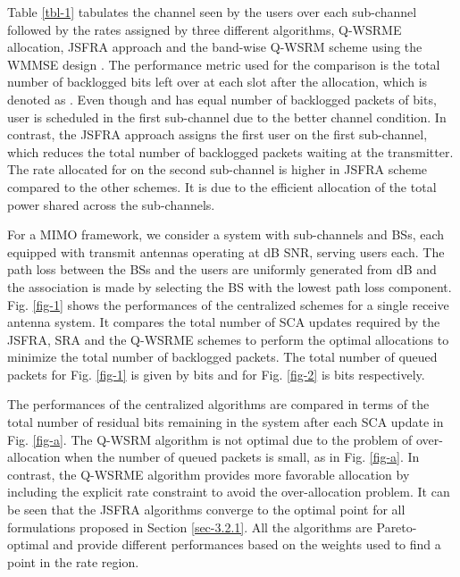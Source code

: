 Table \ref{tbl-1} tabulates the channel seen by the users over each sub-channel followed by the rates assigned by three different algorithms, \ac{Q-WSRME} allocation, \ac{JSFRA} approach and the band-wise \ac{Q-WSRM} scheme using the \ac{WMMSE} design \cite{wmmse_shi}. The performance metric used for the comparison is the total number of backlogged bits left over at each slot after the allocation, which is denoted as . Even though  and  has equal number of backlogged packets of  bits, user  is scheduled in the first sub-channel due to the better channel condition. In contrast, the \ac{JSFRA} approach assigns the first user on the first sub-channel, which reduces the total number of backlogged packets waiting at the transmitter. The rate allocated for  on the second sub-channel is higher in \ac{JSFRA} scheme compared to the other schemes. It is due to the efficient allocation of the total power shared across the sub-channels.

For a \ac{MIMO} framework, we consider a system with  sub-channels and  \acp{BS}, each equipped with  transmit antennas operating at dB \ac{SNR}, serving  users each. The path loss between the \acp{BS} and the users are uniformly generated from \me{[0,-3]} dB and the association is made by selecting the \ac{BS} with the lowest path loss component. Fig. \ref{fig-1} shows the performances of the centralized schemes for a single receive antenna system. It compares the total number of \ac{SCA} updates required by the \ac{JSFRA}, \ac{SRA} and the \ac{Q-WSRME} schemes to perform the optimal allocations to minimize the total number of backlogged packets. The total number of queued packets for Fig. \ref{fig-1} is given by  bits and for Fig. \ref{fig-2} is  bits respectively.

The performances of the centralized algorithms are compared in terms of the total number of residual bits remaining in the system after each \ac{SCA} update in Fig. \ref{fig-a}. The \ac{Q-WSRM} algorithm is not optimal due to the problem of over-allocation when the number of queued packets is small, as in Fig. \ref{fig-a}. In contrast, the \ac{Q-WSRME} algorithm provides more favorable allocation by including the explicit rate constraint to avoid the over-allocation problem. It can be seen that the \ac{JSFRA} algorithms converge to the optimal point for all formulations proposed in Section \ref{sec-3.2.1}. All the algorithms are Pareto-optimal and provide different performances based on the weights used to find a point in the rate region. 

